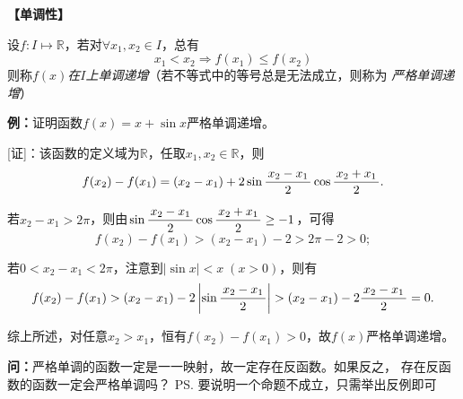 {\bf 【单调性】}

设$f:I\mapsto\mathbb{R}$，若对$\forall x_1,x_2\in I$，总有
$$x_1<x_2\Rightarrow f(x_1)\leq f(x_2)$$
则称{\it $f(x)$在$I$上单调递增}（若不等式中的等号总是无法成立，则称为
{\it 严格单调递增}）
	
{\b{\bf 例：}证明函数$f(x)=x+\sin x$严格单调递增。}

\begin{center}
\end{center}

[证]：该函数的定义域为$\mathbb{R}$，任取$x_1,x_2\in\mathbb{R}$，则
$$f(x_2)-f(x_1)=(x_2-x_1)+2\sin\displaystyle\frac{\,{x_2-x_1}\,}{\,{2}\,}\cos\displaystyle\frac{\,{x_2+x_1}\,}{\,{2}\,}.$$

若$x_2-x_1>2\pi$，则由$\sin\displaystyle\frac{\,{x_2-x_1}\,}{\,{2}\,}\cos\displaystyle\frac{\,{x_2+x_1}\,}{\,{2}\,}\geq -1$，可得
$$f(x_2)-f(x_1)>(x_2-x_1)-2>2\pi-2>0;$$

若$0<x_2-x_1<2\pi$，注意到$|\sin x|<x\;(x>0)$，则有
$$f(x_2)-f(x_1)>(x_2-x_1)-2\left|\sin\displaystyle\frac{\,{x_2-x_1}\,}{\,{2}\,}\right|
>(x_2-x_1)-2\displaystyle\frac{\,{x_2-x_1}\,}{\,{2}\,}=0.$$

综上所述，对任意$x_2>x_1$，恒有$f(x_2)-f(x_1)>0$，故$f(x)$严格单调递增。


{\b{\bf 问：}严格单调的函数一定是一一映射，故一定存在反函数。如果反之，
存在反函数的函数一定会严格单调吗？}
\ps{要说明一个命题不成立，只需举出反例即可}

